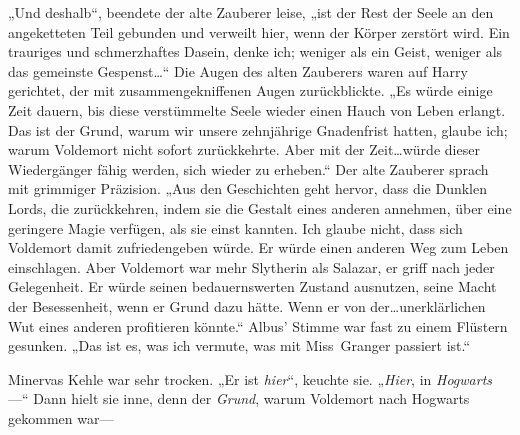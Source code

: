 „Und deshalb“, beendete der alte Zauberer leise, „ist der Rest der Seele an den angeketteten Teil gebunden und verweilt hier, wenn der Körper zerstört wird. Ein trauriges und schmerzhaftes Dasein, denke ich; weniger als ein Geist, weniger als das gemeinste Gespenst…“ Die Augen des alten Zauberers waren auf Harry gerichtet, der mit zusammengekniffenen Augen zurückblickte.
„Es würde einige Zeit dauern, bis diese verstümmelte Seele wieder einen Hauch von Leben erlangt. Das ist der Grund, warum wir unsere zehnjährige Gnadenfrist hatten, glaube ich; warum Voldemort nicht sofort zurückkehrte. Aber mit der Zeit…würde dieser Wiedergänger fähig werden, sich wieder zu erheben.“ Der alte Zauberer sprach mit grimmiger Präzision.
„Aus den Geschichten geht hervor, dass die Dunklen Lords, die zurückkehren, indem sie die Gestalt eines anderen annehmen, über eine geringere Magie verfügen, als sie einst kannten. Ich glaube nicht, dass sich Voldemort damit zufriedengeben würde. Er würde einen anderen Weg zum Leben einschlagen. Aber Voldemort war mehr Slytherin als Salazar, er griff nach jeder Gelegenheit. Er würde seinen bedauernswerten Zustand ausnutzen, seine Macht der Besessenheit, wenn er Grund dazu hätte. Wenn er von der…unerklärlichen Wut eines anderen profitieren könnte.“ Albus’ Stimme war fast zu einem Flüstern gesunken.
„Das ist es, was ich vermute, was mit Miss~Granger passiert ist.“

%
Minervas Kehle war sehr trocken.
„Er ist \emph{hier}“, keuchte sie. „\emph{Hier}, in \emph{Hogwarts}—“ Dann hielt sie inne, denn der \emph{Grund}, warum Voldemort nach Hogwarts gekommen war—

